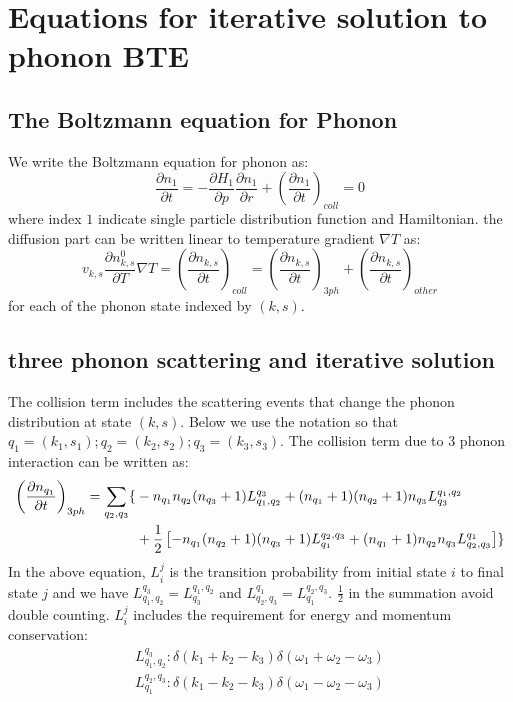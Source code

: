 \documentclass{article}
\newcommand{\pfrac}[2]{\frac{\partial #1}{\partial #2}}
\begin{document}
\section{Equations for iterative solution to phonon BTE}

\subsection{The Boltzmann equation for Phonon}
We write the Boltzmann equation for phonon as:
\begin{equation}
    \pfrac{n_1}{t} = -\pfrac{H_1}{p} \pfrac{n_1}{r} + \left( \pfrac{n_1}{t} \right)_{coll} = 0 
\end{equation}
where index $1$ indicate single particle distribution function and Hamiltonian. 
the diffusion part can be written linear to temperature gradient $\nabla T$ as:
\begin{equation}
    v_{k,s} \pfrac{n_{k,s}^0}{T} \nabla T = \left( \pfrac{n_{k,s}}{t} \right)_{coll} 
            = \left( \pfrac{n_{k,s}}{t} \right)_{3ph}  + \left( \pfrac{n_{k,s}}{t} \right)_{other} \label{bte}
\end{equation}
for each of the phonon state indexed by $(k,s)$. 

\subsection{three phonon scattering and iterative solution}

The collision term includes the scattering events that change the phonon distribution at state $(k,s)$.
Below we use the notation so that $q_1 = (k_1, s_1); q_2 = (k_2, s_2); q_3 = (k_3, s_3)$. The collision term due to 
3 phonon interaction can be written as:
\begin{align}
    \left( \pfrac{n_{q_1}}{t} \right)_{3ph} = \sum_{q_2,q_3} 
        \{ &-n_{q_1}n_{q_2}(n_{q_3}+1)L_{q_1,q_2}^{q_3} + (n_{q_1}+1)(n_{q_2}+1)n_{q_3}L^{q_1,q_2}_{q_3}  \notag \\
           &+ \frac{1}{2} \left[ -n_{q_1}(n_{q_2}+1)(n_{q_3}+1)L_{q_1}^{q_2,q_3} +  (n_{q_1}+1)n_{q_2}n_{q_3}L^{q_1}_{q_2,q_3} \right] \} \label{summation}
\end{align}
In the above equation, $L_i^j$ is the transition probability from initial state $i$ to final state $j$
and we have $L_{q_1,q_2}^{q_3} = L^{q_1,q_2}_{q_3}$ 
and $L_{q_2,q_3}^{q_1} = L^{q_2,q_3}_{q_1}$. 
$\frac{1}{2}$ in the summation avoid double counting. $L_i^j$ includes the requirement for energy and momentum conservation:
\begin{align}
    L_{q_1,q_2}^{q_3} : \delta(k_1 + k_2 - k_3) \delta(\omega_1 + \omega_2 - \omega_3 ) \\
    L^{q_2,q_3}_{q_1} : \delta(k_1 - k_2 - k_3) \delta(\omega_1 - \omega_2 - \omega_3 ) 
\end{align}
\end{document}
